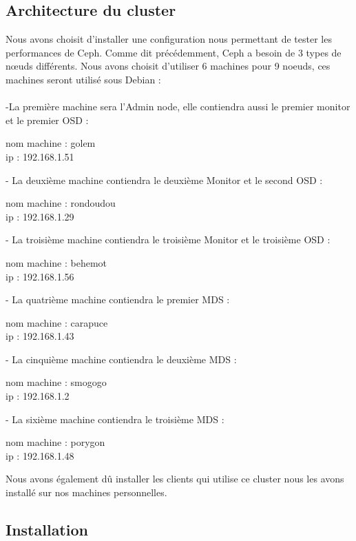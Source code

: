 \documentclass{article}
\begin{document}
	\subsection{Architecture du cluster}
	Nous avons choisit d'installer une configuration nous permettant de tester les performances de Ceph. Comme dit précédemment, Ceph a besoin de 3 types de nœuds différents. Nous avons choisit d'utiliser 6 machines pour 9 noeuds, ces machines seront utilisé sous Debian :
\\\\-La première machine sera l'Admin node, elle contiendra aussi le premier monitor et le premier OSD :

nom machine : golem
\\ip : 192.168.1.51

- La deuxième machine contiendra le deuxième Monitor et le second OSD :

nom machine : rondoudou 
\\ip :  192.168.1.29

- La troisième machine contiendra le troisième Monitor et le troisième OSD :

nom machine : behemot
\\ip :    192.168.1.56

- La quatrième machine contiendra le premier MDS :

nom machine : carapuce 
\\ip : 192.168.1.43

- La cinquième machine contiendra le deuxième MDS :

nom machine : smogogo
\\ip : 192.168.1.2

- La sixième machine contiendra le troisième MDS :

nom machine : porygon
\\ip : 192.168.1.48

Nous avons également dû installer les clients qui utilise ce cluster nous les avons installé sur nos machines personnelles.

	\subsection{Installation}
\end{document}
